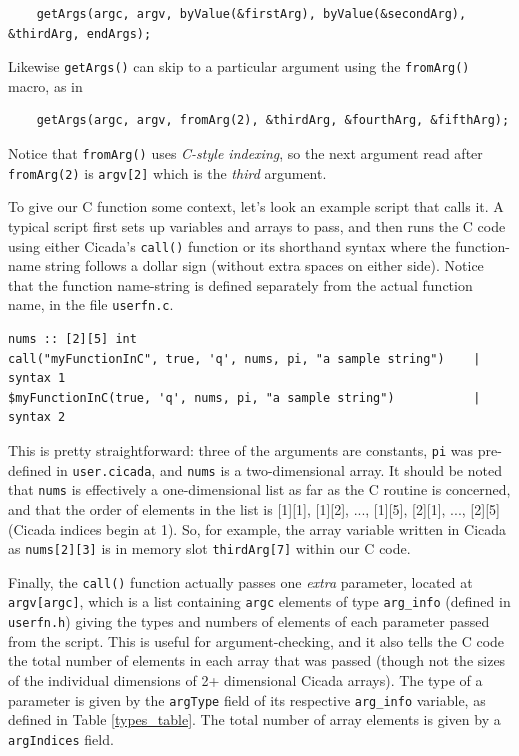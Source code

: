 \documentclass{article}
\newenvironment{code}{
       \begin{list}{}{
               \setlength{\leftmargin}{.4in}
               \setlength{\rightmargin}{0in}
               \setlength{\topsep}{.2in}
       }
       \small
       \item[] }
       { \end{list}   }
\begin{document}
\begin{code} \begin{verbatim}
    getArgs(argc, argv, byValue(&firstArg), byValue(&secondArg), &thirdArg, endArgs);
\end{verbatim} \end{code}

\noindent Likewise \verb#getArgs()# can skip to a particular argument using the \verb#fromArg()# macro, as in

\begin{code} \begin{verbatim}
    getArgs(argc, argv, fromArg(2), &thirdArg, &fourthArg, &fifthArg);
\end{verbatim} \end{code}

\noindent Notice that \verb#fromArg()# uses \emph{C-style indexing}, so the next argument read after \verb#fromArg(2)# is \verb#argv[2]# which is the \emph{third} argument.

To give our C function some context, let's look an example script that calls it.  A typical script first sets up variables and arrays to pass, and then runs the C code using either Cicada's \verb#call()# function or its shorthand syntax where the function-name string follows a dollar sign (without extra spaces on either side).  Notice that the function name-string is defined separately from the actual function name, in the file \verb#userfn.c#.

\begin{code} \begin{verbatim}
nums :: [2][5] int
call("myFunctionInC", true, 'q', nums, pi, "a sample string")    | syntax 1
$myFunctionInC(true, 'q', nums, pi, "a sample string")           | syntax 2
\end{verbatim} \end{code}

\noindent This is pretty straightforward:  three of the arguments are constants, \verb#pi# was pre-defined in \verb#user.cicada#, and \verb#nums# is a two-dimensional array.  It should be noted that \verb#nums# is effectively a one-dimensional list as far as the C routine is concerned, and that the order of elements in the list is [1][1], [1][2], ..., [1][5], [2][1], ..., [2][5] (Cicada indices begin at 1).  So, for example, the array variable written in Cicada as \verb#nums[2][3]# is in memory slot \verb#thirdArg[7]# within our C code.

Finally, the \verb#call()# function actually passes one \emph{extra} parameter, located at \verb#argv[argc]#, which is a list containing \verb#argc# elements of type \verb#arg_info# (defined in \verb#userfn.h#) giving the types and numbers of elements of each parameter passed from the script.  This is useful for argument-checking, and it also tells the C code the total number of elements in each array that was passed (though not the sizes of the individual dimensions of 2+ dimensional Cicada arrays).  The type of a parameter is given by the \verb#argType# field of its respective \verb#arg_info# variable, as defined in Table \ref{types_table}.  The total number of array elements is given by a \verb#argIndices# field.
\end{document}
